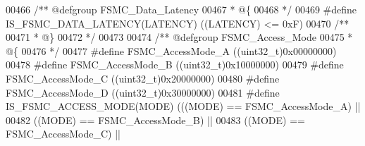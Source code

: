 \begin{DoxyCode}
00466 \textcolor{comment}{/** @defgroup FSMC\_Data\_Latency }
00467 \textcolor{comment}{  * @\{}
00468 \textcolor{comment}{  */}
00469 \textcolor{preprocessor}{#}\textcolor{preprocessor}{define} \textcolor{preprocessor}{IS\_FSMC\_DATA\_LATENCY}\textcolor{preprocessor}{(}\textcolor{preprocessor}{LATENCY}\textcolor{preprocessor}{)} \textcolor{preprocessor}{(}\textcolor{preprocessor}{(}\textcolor{preprocessor}{LATENCY}\textcolor{preprocessor}{)} \textcolor{preprocessor}{<=} 0xF\textcolor{preprocessor}{)}
00470 \textcolor{comment}{/**}
00471 \textcolor{comment}{  * @\}}
00472 \textcolor{comment}{  */}
00473 
00474 \textcolor{comment}{/** @defgroup FSMC\_Access\_Mode }
00475 \textcolor{comment}{  * @\{}
00476 \textcolor{comment}{  */}
00477 \textcolor{preprocessor}{#}\textcolor{preprocessor}{define} \textcolor{preprocessor}{FSMC\_AccessMode\_A}                        \textcolor{preprocessor}{(}\textcolor{preprocessor}{(}\textcolor{preprocessor}{uint32\_t}\textcolor{preprocessor}{)}0x00000000\textcolor{preprocessor}{)}
00478 \textcolor{preprocessor}{#}\textcolor{preprocessor}{define} \textcolor{preprocessor}{FSMC\_AccessMode\_B}                        \textcolor{preprocessor}{(}\textcolor{preprocessor}{(}\textcolor{preprocessor}{uint32\_t}\textcolor{preprocessor}{)}0x10000000\textcolor{preprocessor}{)}
00479 \textcolor{preprocessor}{#}\textcolor{preprocessor}{define} \textcolor{preprocessor}{FSMC\_AccessMode\_C}                        \textcolor{preprocessor}{(}\textcolor{preprocessor}{(}\textcolor{preprocessor}{uint32\_t}\textcolor{preprocessor}{)}0x20000000\textcolor{preprocessor}{)}
00480 \textcolor{preprocessor}{#}\textcolor{preprocessor}{define} \textcolor{preprocessor}{FSMC\_AccessMode\_D}                        \textcolor{preprocessor}{(}\textcolor{preprocessor}{(}\textcolor{preprocessor}{uint32\_t}\textcolor{preprocessor}{)}0x30000000\textcolor{preprocessor}{)}
00481 \textcolor{preprocessor}{#}\textcolor{preprocessor}{define} \textcolor{preprocessor}{IS\_FSMC\_ACCESS\_MODE}\textcolor{preprocessor}{(}\textcolor{preprocessor}{MODE}\textcolor{preprocessor}{)} \textcolor{preprocessor}{(}\textcolor{preprocessor}{(}\textcolor{preprocessor}{(}\textcolor{preprocessor}{MODE}\textcolor{preprocessor}{)} \textcolor{preprocessor}{==} FSMC_AccessMode_A\textcolor{preprocessor}{)} \textcolor{preprocessor}{||}
00482                                    \textcolor{preprocessor}{(}\textcolor{preprocessor}{(}\textcolor{preprocessor}{MODE}\textcolor{preprocessor}{)} \textcolor{preprocessor}{==} FSMC_AccessMode_B\textcolor{preprocessor}{)} \textcolor{preprocessor}{||}
00483                                    \textcolor{preprocessor}{(}\textcolor{preprocessor}{(}\textcolor{preprocessor}{MODE}\textcolor{preprocessor}{)} \textcolor{preprocessor}{==} FSMC_AccessMode_C\textcolor{preprocessor}{)} \textcolor{preprocessor}{||}

\end{DoxyCode}
